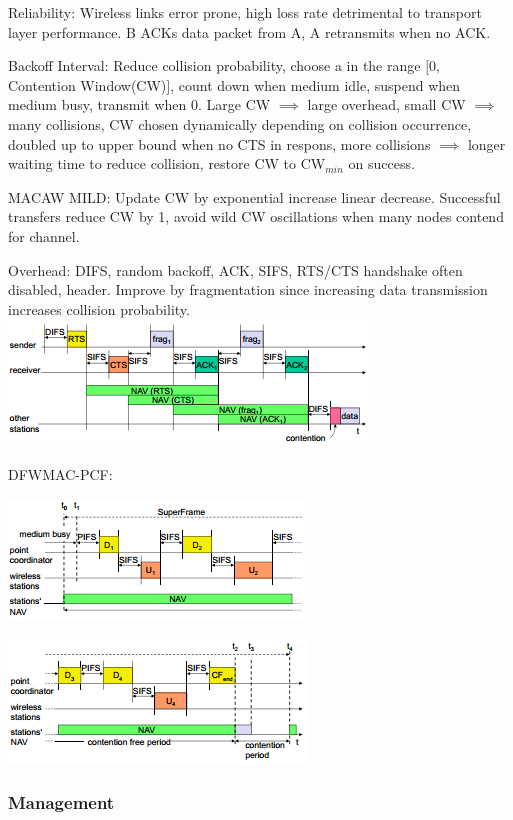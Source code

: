 \documentclass[9pt]{extarticle}
\begin{document}
\begin{multicols}{2}
Reliability: Wireless links error prone, high loss rate detrimental to transport layer performance. B ACKs data packet from A, A retransmits when no ACK.

Backoff Interval: Reduce collision probability, choose a in the range $[0$, Contention Window(CW)$]$, count down when medium idle, suspend when medium busy, transmit when 0. Large CW $\implies$ large overhead, small CW $\implies$  many collisions, CW chosen dynamically depending on collision occurrence, doubled up to upper bound when no CTS in respons, more collisions $\implies$ longer waiting time to reduce collision, restore CW to CW$_{min}$ on success.

MACAW MILD: Update CW by exponential increase linear decrease. Successful transfers reduce CW by 1, avoid wild CW oscillations when many nodes contend for channel. 

Overhead: DIFS, random backoff, ACK, SIFS, RTS/CTS handshake often disabled, header. Improve by fragmentation since increasing data transmission increases collision probability. \includegraphics{fragmentation.png}

DFWMAC-PCF: 

\includegraphics{dfwmac-pcf1.png}

\includegraphics{dfwmac-pcf2.png}

\subsubsection{Management}


\end{multicols}
\end{document}
